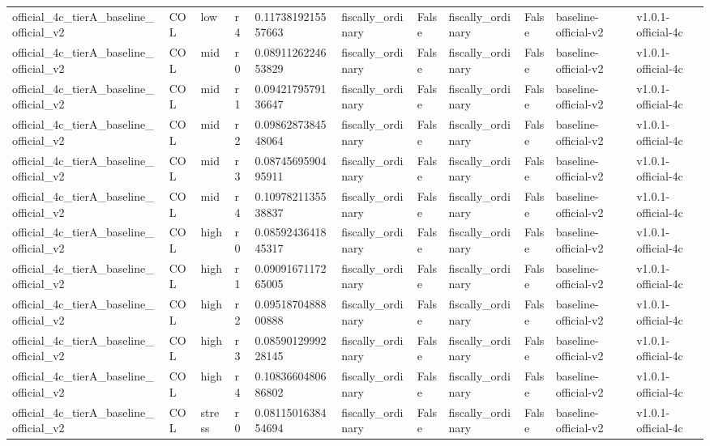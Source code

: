 \begin{landscape}
\begin{longtable}{lllllllllll}
official\_4c\_tierA\_baseline\_official\_v2 & COL & low & r4 & 0.1173819215557663 & fiscally\_ordinary & False & fiscally\_ordinary & False & baseline-official-v2 & v1.0.1-official-4c \\
official\_4c\_tierA\_baseline\_official\_v2 & COL & mid & r0 & 0.0891126224653829 & fiscally\_ordinary & False & fiscally\_ordinary & False & baseline-official-v2 & v1.0.1-official-4c \\
official\_4c\_tierA\_baseline\_official\_v2 & COL & mid & r1 & 0.0942179579136647 & fiscally\_ordinary & False & fiscally\_ordinary & False & baseline-official-v2 & v1.0.1-official-4c \\
official\_4c\_tierA\_baseline\_official\_v2 & COL & mid & r2 & 0.0986287384548064 & fiscally\_ordinary & False & fiscally\_ordinary & False & baseline-official-v2 & v1.0.1-official-4c \\
official\_4c\_tierA\_baseline\_official\_v2 & COL & mid & r3 & 0.0874569590495911 & fiscally\_ordinary & False & fiscally\_ordinary & False & baseline-official-v2 & v1.0.1-official-4c \\
official\_4c\_tierA\_baseline\_official\_v2 & COL & mid & r4 & 0.1097821135538837 & fiscally\_ordinary & False & fiscally\_ordinary & False & baseline-official-v2 & v1.0.1-official-4c \\
official\_4c\_tierA\_baseline\_official\_v2 & COL & high & r0 & 0.0859243641845317 & fiscally\_ordinary & False & fiscally\_ordinary & False & baseline-official-v2 & v1.0.1-official-4c \\
official\_4c\_tierA\_baseline\_official\_v2 & COL & high & r1 & 0.0909167117265005 & fiscally\_ordinary & False & fiscally\_ordinary & False & baseline-official-v2 & v1.0.1-official-4c \\
official\_4c\_tierA\_baseline\_official\_v2 & COL & high & r2 & 0.0951870488800888 & fiscally\_ordinary & False & fiscally\_ordinary & False & baseline-official-v2 & v1.0.1-official-4c \\
official\_4c\_tierA\_baseline\_official\_v2 & COL & high & r3 & 0.0859012999228145 & fiscally\_ordinary & False & fiscally\_ordinary & False & baseline-official-v2 & v1.0.1-official-4c \\
official\_4c\_tierA\_baseline\_official\_v2 & COL & high & r4 & 0.1083660480686802 & fiscally\_ordinary & False & fiscally\_ordinary & False & baseline-official-v2 & v1.0.1-official-4c \\
official\_4c\_tierA\_baseline\_official\_v2 & COL & stress & r0 & 0.0811501638454694 & fiscally\_ordinary & False & fiscally\_ordinary & False & baseline-official-v2 & v1.0.1-official-4c \\

\end{longtable}
\end{landscape}
